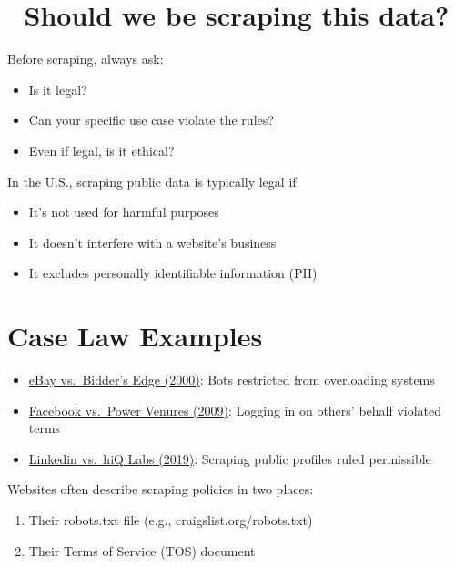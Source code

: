 \documentclass[
  letterpaper,
  DIV=11,
  numbers=noendperiod]{scrartcl}
\providecommand{\tightlist}{%
  \setlength{\itemsep}{0pt}\setlength{\parskip}{0pt}}\usepackage{longtable,booktabs,array}
\begin{document}
\hypertarget{should-we-be-scraping-this-data}{%
\section{🛑 Should we be scraping this
data?}\label{should-we-be-scraping-this-data}}

Before scraping, always ask:

\begin{itemize}
\tightlist
\item
  Is it legal?
\item
  Can your specific use case violate the rules?
\item
  Even if legal, is it ethical?
\end{itemize}

In the U.S., scraping public data is typically legal if:

\begin{itemize}
\tightlist
\item
  It's not used for harmful purposes
\item
  It doesn't interfere with a website's business
\item
  It excludes personally identifiable information (PII)
\end{itemize}

\hypertarget{case-law-examples}{%
\section{Case Law Examples}\label{case-law-examples}}

\begin{itemize}
\tightlist
\item
  \href{https://en.wikipedia.org/wiki/EBay_v._Bidder\textquotesingle{}s_Edge\#Order}{eBay
  vs.~Bidder's Edge (2000)}: Bots restricted from overloading systems
\item
  \href{https://en.wikipedia.org/wiki/Facebook,_Inc._v._Power_Ventures,_Inc.\#Ruling}{Facebook
  vs.~Power Venures (2009)}: Logging in on others' behalf violated terms
\item
  \href{https://en.wikipedia.org/wiki/HiQ_Labs_v._LinkedIn}{Linkedin
  vs.~hiQ Labs (2019)}: Scraping public profiles ruled permissible
\end{itemize}

Websites often describe scraping policies in two places:

\begin{enumerate}
\def\labelenumi{\arabic{enumi}.}
\tightlist
\item
  Their robots.txt file (e.g., craigslist.org/robots.txt)
\item
  Their Terms of Service (TOS) document
\end{enumerate}
\end{document}
